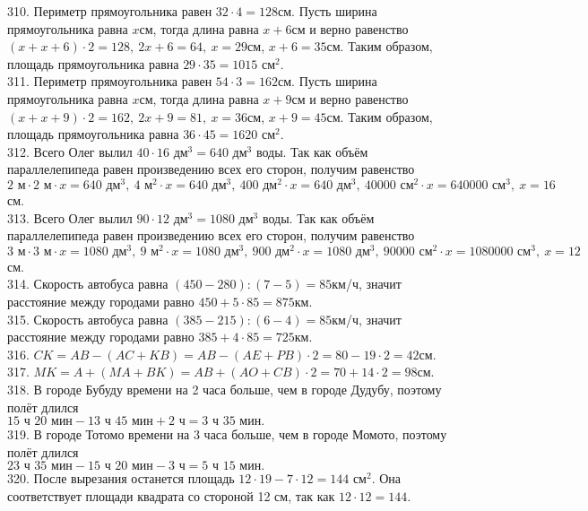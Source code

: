 310. Периметр прямоугольника равен $32\cdot4=128$см. Пусть ширина прямоугольника равна $x$см, тогда длина равна $x+6$см и верно равенство $(x+x+6)\cdot2=128,\ 2x+6=64,\ x=29$см, $x+6=35$см. Таким образом, площадь прямоугольника равна $29\cdot35=1015\text{ см}^2.$\\
311. Периметр прямоугольника равен $54\cdot3=162$см. Пусть ширина прямоугольника равна $x$см, тогда длина равна $x+9$см и верно равенство $(x+x+9)\cdot2=162,\ 2x+9=81,\ x=36$см, $x+9=45$см. Таким образом, площадь прямоугольника равна $36\cdot45=1620\text{ см}^2.$\\
312. Всего Олег вылил $40\cdot16\text{ дм}^3=640\text{ дм}^3$ воды. Так как объём параллелепипеда равен произведению всех его сторон, получим равенство $2\text{ м}\cdot2\text{ м}\cdot x=640\text{ дм}^3,\ 4\text{ м}^2\cdot x=640\text { дм}^3,\ 400\text{ дм}^2\cdot x=640\text { дм}^3,\
40000\text{ см}^2\cdot x=640000\text { см}^3,\ x=16$см.\\
313. Всего Олег вылил $90\cdot12\text{ дм}^3=1080\text{ дм}^3$ воды. Так как объём параллелепипеда равен произведению всех его сторон, получим равенство $3\text{ м}\cdot3\text{ м}\cdot x=1080\text{ дм}^3,\ 9\text{ м}^2\cdot x=1080\text { дм}^3,\ 900\text{ дм}^2\cdot x=1080\text { дм}^3,\
90000\text{ см}^2\cdot x=1080000\text { см}^3,\ x=12$см.\\
314. Скорость автобуса равна $(450-280):(7-5)=85$км/ч, значит расстояние между городами равно $450+5\cdot85=875$км.\\
315. Скорость автобуса равна $(385-215):(6-4)=85$км/ч, значит расстояние между городами равно $385+4\cdot85=725$км.\\
316. $CK=AB-(AC+KB)=AB-(AE+PB)\cdot2=80-19\cdot2=42$см.\\
317. $MK=A+(MA+BK)=AB+(AO+CB)\cdot2=70+14\cdot2=98$см.\\
318. В городе Бубуду времени на 2 часа больше, чем в городе Дудубу, поэтому полёт длился\\ $15\text{ ч }20\text{ мин}-13\text{ ч }45\text{ мин}+2\text{ ч}=3\text{ ч }35\text{ мин}.$\\
319. В городе Тотомо времени на 3 часа больше, чем в городе Момото, поэтому полёт длился\\ $23\text{ ч }35\text{ мин}-15\text{ ч }20\text{ мин}-3\text{ ч}=5\text{ ч }15\text{ мин}.$\\
320. После вырезания останется площадь $12\cdot19-7\cdot12=144\text{ см}^2.$ Она соответствует площади квадрата со стороной 12 см, так как $12\cdot 12=144.$\\
